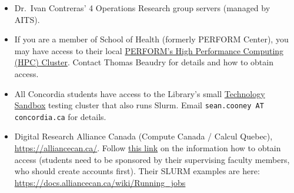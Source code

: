 \begin{itemize}
    \item
    Dr.~Ivan Contreras' 4 Operations Research group servers (managed by AITS).

    \item
    If you are a member of School of Health (formerly PERFORM Center),
    you may have access to their local
    \href{https://perform-wiki.concordia.ca/mediawiki/index.php/HPC_Cluster}{PERFORM's High Performance Computing (HPC) Cluster}.
    Contact Thomas Beaudry for details and how to obtain access.

    \item
    All Concordia students have access to the Library's small
    \href{https://library.concordia.ca/technology/sandbox/}{Technology Sandbox}
    testing cluster that also runs Slurm. Email \texttt{sean.cooney AT concordia.ca} for details.

    \item
    Digital Research Alliance Canada (Compute Canada / Calcul Quebec),\\
    \url{https://alliancecan.ca/}. Follow
    \href{https://alliancecan.ca/en/services/advanced-research-computing/account-management/apply-account}{this link}
    on the information how to obtain access (students need to be sponsored
    by their supervising faculty members, who should create accounts first).
    Their SLURM examples are here: \url{https://docs.alliancecan.ca/wiki/Running_jobs}

\end{itemize}